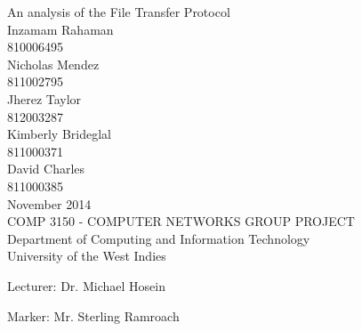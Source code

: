 \thispagestyle{empty}
\begin{center}
\Huge{An analysis of the File Transfer Protocol}\\[2pc]

\Large  {
            Inzamam Rahaman\\
            810006495\\
            Nicholas Mendez\\
            811002795\\
            Jherez Taylor\\
            812003287\\
            Kimberly Brideglal\\
            811000371\\
            David Charles\\
            811000385
        }
        \\[1pc]
\large{November 2014}\\[2pc]

COMP 3150 - COMPUTER NETWORKS GROUP PROJECT\\
Department of Computing and Information Technology\\
University of the West Indies
\end{center}
\vfill

\noindent Lecturer: Dr. Michael Hosein

\noindent Marker: Mr. Sterling Ramroach

